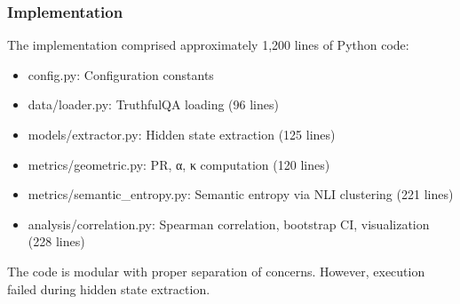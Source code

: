 \subsubsection{Implementation}

The implementation comprised approximately 1,200 lines of Python code:

\begin{itemize}
\item config.py: Configuration constants
\item data/loader.py: TruthfulQA loading (96 lines)
\item models/extractor.py: Hidden state extraction (125 lines)
\item metrics/geometric.py: PR, α, κ computation (120 lines)
\item metrics/semantic_entropy.py: Semantic entropy via NLI clustering (221 lines)
\item analysis/correlation.py: Spearman correlation, bootstrap CI, visualization (228 lines)
\end{itemize}

The code is modular with proper separation of concerns. However, execution failed during hidden state extraction.
